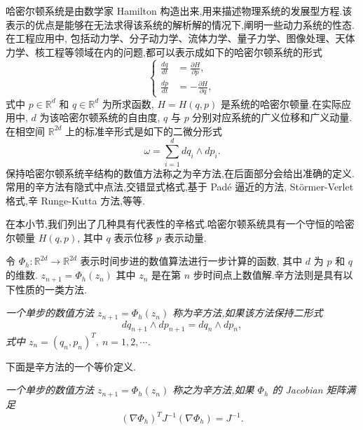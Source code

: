 哈密尔顿系统是由数学家 Hamilton 构造出来,用来描述物理系统的发展型方程.该表示的优点是能够在无法求得该系统的解析解的情况下,阐明一些动力系统的性态.在工程应用中, 包括动力学、分子动力学、流体力学、量子力学、图像处理、天体力学、核工程等领域在内的问题,都可以表示成如下的哈密尔顿系统的形式 \cite{arieh2009afirst}
\begin{equation}\label{eq:Hamiltonian}
\left\lbrace
\begin{aligned}
\frac{dq}{dt}&=\frac{\partial H}{\partial p},\\
\frac{dp}{dt}&=-\frac{\partial H}{\partial q},
\end{aligned}
\right.
\end{equation}
式中 $p \in \mathbb{R}^d$ 和 $q \in \mathbb{R}^d$ 为所求函数, $H=H(q,p)$ 是系统的哈密尔顿量.在实际应用中, $d$ 为该哈密尔顿系统的自由度, $q$ 与 $p$ 分别对应系统的广义位移和广义动量.在相空间 $\mathbb{R}^{2d}$ 上的标准辛形式是如下的二微分形式
\begin{equation*}
\omega = \sum_{i=1}^d d q_i \wedge d p_i.
\end{equation*}
保持哈密尔顿系统辛结构的数值方法称之为辛方法,在后面部分会给出准确的定义.常用的辛方法有隐式中点法,交错显式格式,基于 Pad\'{e} 逼近的方法, St\"{o}rmer-Verlet 格式,辛 Runge-Kutta 方法,等等.

在本小节,我们列出了几种具有代表性的辛格式.哈密尔顿系统具有一个守恒的哈密尔顿量 $H(q,p)$, 其中 $q$ 表示位移 $p$ 表示动量.


令 $\Phi_h : \mathbb{R}^{2d} \to \mathbb{R}^{2d}$ 表示时间步进的数值算法进行一步计算的函数, 其中 $d$ 为 $p$ 和 $q$ 的维数. $z_{n+1}=\Phi_h(z_n)$ 其中 $z_n$ 是在第 $n$ 步时间点上数值解.辛方法则是具有以下性质的一类方法.

\begin{definition}
\emph{一个单步的数值方法 $z_{n+1}=\Phi_h(z_n)$ 称为辛方法,如果该方法保持二形式
\begin{equation*}
dq_{n+1}\wedge dp_{n+1}=dq_n\wedge dp_n,
\end{equation*}
式中 $z_n=(q_n,p_n)^T,~n=1,2,\cdots$.}
\end{definition}

下面是辛方法的一个等价定义.

\begin{definition}\label{def:symplectic}
\emph{一个单步的数值方法 $z_{n+1}=\Phi_h(z_n)$ 称之为辛方法,如果 $\Phi_h$ 的 Jacobian 矩阵满足
\begin{equation*}
(\nabla\Phi_h)^TJ^{-1}(\nabla\Phi_h)=J^{-1}.
\end{equation*}}
\end{definition}

